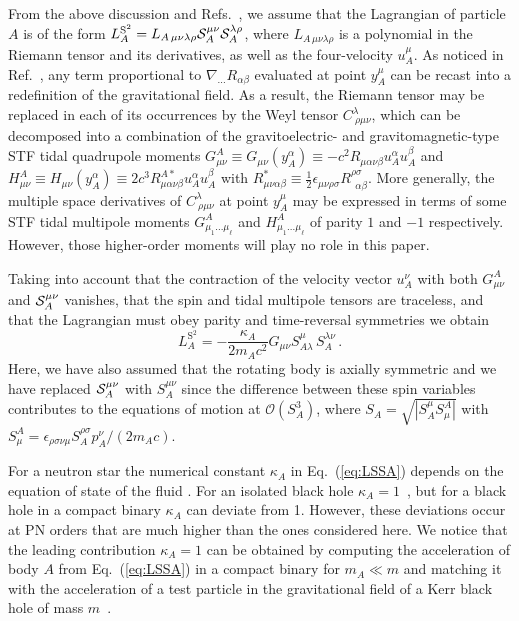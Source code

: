 \documentclass[aps, prd,
twocolumn,%
superscriptaddress,
showpacs, nofootinbib, eqsecnum, amsmath, amssymb, floatfix
]{revtex4}
\begin{document}
From the above discussion and Refs.~\cite{Porto:2005ac,
PortoRothstein2006}, we assume that the Lagrangian of particle $A$
is of the form $L^{\text{S}^2}_A=L_{A\, \mu\nu\lambda\rho}
{{{\cal{S}}}}_A^{\mu\nu} {{{\cal{S}}}}_A^{\lambda\rho}$, where
$L_{A\, \mu\nu\lambda\rho}$ is a polynomial in the Riemann tensor
and its derivatives, as well as the four-velocity $u_A^\mu$. As
noticed in Ref.~\cite{DE98a}, any term proportional to
$\nabla_{...}R_{\alpha\beta}$ evaluated at point $y_A^\mu$ can be
recast into a redefinition of the gravitational field. As a result,
the Riemann tensor may be replaced in each of its occurrences by the
Weyl tensor $C^\lambda_{~\rho\mu\nu}$, which can be decomposed into
a combination of the gravitoelectric- and gravitomagnetic-type STF
tidal quadrupole moments $G_{\mu\nu}^A \equiv G_{\mu\nu}(y_A^\alpha)
\equiv - c^2 R_{\mu\alpha\nu\beta} u_A^{\alpha} u_A^{\beta}$ and
$H^A_{\mu\nu}\equiv H_{\mu\nu}(y_A^\alpha) \equiv 2 c^3
R^{A*}_{\mu\alpha\nu\beta} u_A^{\alpha} u_A^{\beta}$ with
$R^*_{\mu\nu\alpha\beta} \equiv \frac{1}{2}
\epsilon_{\mu\nu\rho\sigma} R^{\rho\sigma}_{~~\alpha\beta}$. More
generally, the multiple space derivatives of
$C^\lambda_{~\rho\mu\nu}$ at point $y_A^\mu$ may be expressed in
terms of some STF tidal multipole moments $G^A_{\mu_1 ...\mu_\ell}$
and $H^A_{\mu_1 ... \mu_\ell}$ of parity $1$ and $-1$ respectively.
However, those higher-order moments will play no role in this paper.

Taking into account that the contraction of the velocity vector $u_A^\nu$
with both $G^A_{\mu\nu}$ and ${{{\cal{S}}}}^{\mu\nu}_A$ vanishes, that the
spin and tidal multipole tensors are traceless, and that the Lagrangian must
obey parity and time-reversal
symmetries %
we obtain~\cite{1980AnPhy.130..188B,Porto:2005ac,PortoRothstein2006,
Porto:2008jj}
%
\begin{equation} \label{eq:LSSA}
L^{\text{S}^2}_A = - \frac{\kappa_A}{2 m_A c^2} G_{\mu\nu} S^\mu_{A
  \lambda}\,S_A^{\lambda \nu} \, .
\end{equation}
%
Here, we have also assumed that the rotating body is axially symmetric and we
have replaced ${{{\cal{S}}}}^{\mu \nu}_A$ with $S^{\mu \nu}_A$ since the
difference between these spin variables contributes to the equations of motion
at $\mathcal{O}(S_A^3)$, where $S_A= \sqrt{|S_A^\mu S^A_\mu|}$ with $S^A_\mu =
\epsilon_{\rho\sigma\nu\mu} S^{\rho\sigma}_A p^\nu_A/(2 m_A c)$.

For a neutron star the numerical constant $\kappa_A$ in
Eq.~(\ref{eq:LSSA}) depends on the equation of state of the fluid
\cite{Laarakkers99}. For an isolated black hole
$\kappa_A=1$~\cite{Poisson:1997ha,Damour01c}, but for a black hole
in a compact binary $\kappa_A$ can deviate from 1. However, these
deviations occur at PN orders that are much higher than the ones
considered here. We notice that the leading contribution
$\kappa_A=1$ can be obtained by computing the acceleration of body
$A$ from Eq.~(\ref{eq:LSSA}) in a compact binary for $m_A\ll m$ and
matching it with the acceleration of a test particle in the
gravitational field of a Kerr black hole of mass
$m$~\cite{Porto:2005ac}.
\end{document}
